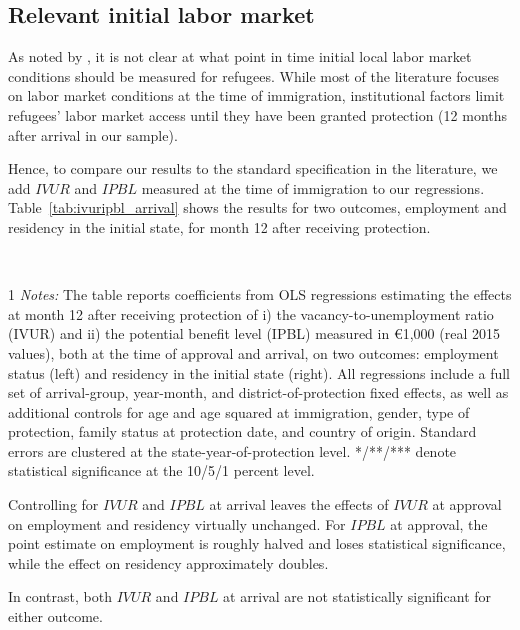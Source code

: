 \subsection{Relevant initial labor market}
As noted by \citet{aslund_when_2007}, it is not clear at what point in time initial local labor market conditions should be measured for refugees. While most of the literature focuses on labor market conditions at the time of immigration, institutional factors limit refugees' labor market access until they have been granted protection (12 months after arrival in our sample). 

Hence, to compare our results to the standard specification in the literature, we add $IVUR$ and $IPBL$ measured at the time of immigration to our regressions. Table~\ref{tab:ivuripbl_arrival} shows the results for two outcomes, employment and residency in the initial state, for month 12 after receiving protection.

\begin{table}
  \centering
  \caption{Effects of $IVUR$ and $IPBL$ at Approval on Employment and Residency \\* controlling for IVUR and IPBL at Arrival}
  \label{tab:ivuripbl_arrival}
  
    \\
  		\begin{tablenotes} 
			\begin{footnotesize}
				\begin{spacing}{1}
					\textit{Notes:} The table reports coefficients from OLS regressions estimating the effects at month 12 after receiving protection of i) the vacancy-to-unemployment ratio (IVUR) and ii) the potential benefit level (IPBL) measured in €1,000 (real 2015 values), both at the time of approval and arrival, on two outcomes: employment status (left) and residency in the initial state (right). All regressions include a full set of arrival-group, year-month, and district-of-protection fixed effects, as well as additional controls for age and age squared at immigration, gender, type of protection, family status at protection date, and country of origin. Standard errors are clustered at the state-year-of-protection level. */**/*** denote statistical significance at the 10/5/1 percent level.
				\end{spacing}
			\end{footnotesize}
		\end{tablenotes}
\end{table}

Controlling for $IVUR$ and $IPBL$ at arrival leaves the effects of $IVUR$ at approval on employment and residency virtually unchanged. For $IPBL$ at approval, the point estimate on employment is roughly halved and loses statistical significance, while the effect on residency approximately doubles. 

In contrast, both $IVUR$ and $IPBL$ at arrival are not statistically significant for either outcome. 